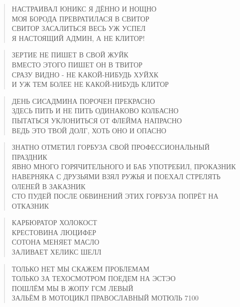 \poemtitle{***}
\begin{verse}
НАСТРАИВАЛ ЮНИКС Я ДЁННО И НОЩНО\\
МОЯ БОРОДА ПРЕВРАТИЛАСЯ В СВИТОР\\
СВИТОР ЗАСАЛИТЬСЯ ВЕСЬ УЖ УСПЕЛ\\
Я НАСТОЯЩИЙ АДМИН, А НЕ КЛИТОР!
\end{verse}

\poemtitle{***}
\begin{verse}
ЗЕРТИЕ НЕ ПИШЕТ В СВОЙ ЖУЙК\\
ВМЕСТО ЭТОГО ПИШЕТ ОН В ТВИТОР\\
СРАЗУ ВИДНО - НЕ КАКОЙ-НИБУДЬ ХУЙХК\\
И УЖ ТЕМ БОЛЕЕ НЕ КАКОЙ-НИБУДЬ КЛИТОР
\end{verse}

\poemtitle{***}
\begin{verse}
ДЕНЬ СИСАДМИНА ПОРОЧЕН ПРЕКРАСНО\\
ЗДЕСЬ ПИТЬ И НЕ ПИТЬ ОДИНАКОВО КОЛБАСНО\\
ПЫТАТЬСЯ УКЛОНИТЬСЯ ОТ ФЛЕЙМА НАПРАСНО\\
ВЕДЬ ЭТО ТВОЙ ДОЛГ, ХОТЬ ОНО И ОПАСНО
\end{verse}

\poemtitle{***}
\begin{verse}
ЗНАТНО ОТМЕТИЛ ГОРБУЗА СВОЙ ПРОФЕССИОНАЛЬНЫЙ ПРАЗДНИК\\
ЯВНО МНОГО ГОРЯЧИТЕЛЬНОГО И БАБ УПОТРЕБИЛ, ПРОКАЗНИК\\
НАВЕРНЯКА С ДРУЗЬЯМИ ВЗЯЛ РУЖЬЯ И ПОЕХАЛ СТРЕЛЯТЬ ОЛЕНЕЙ В ЗАКАЗНИК\\
СТО ПУДЕЙ ПОСЛЕ ОБВИНЕНИЙ ЭТИХ ГОРБУЗА ПОПРЁТ НА ОТКАЗНИК
\end{verse}

\poemtitle{***}
\begin{verse}
КАРБЮРАТОР ХОЛОКОСТ\\
КРЕСТОВИНА ЛЮЦИФЕР\\
СОТОНА МЕНЯЕТ МАСЛО\\
ЗАЛИВАЕТ ХЕЛИКС ШЕЛЛ
\end{verse}

\poemtitle{***}
\begin{verse}
ТОЛЬКО НЕТ МЫ СКАЖЕМ ПРОБЛЕМАМ\\
ТОЛЬКО ЗА ТЕХОСМОТРОМ ПОЕДЕМ НА ЭСТЭО\\
ПОШЛЁМ МЫ В ЖОПУ ГСМ ЛЕВЫЙ\\
ЗАЛЬЁМ В МОТОЦИКЛ ПРАВОСЛАВНЫЙ МОТЮЛЬ 7100
\end{verse}

